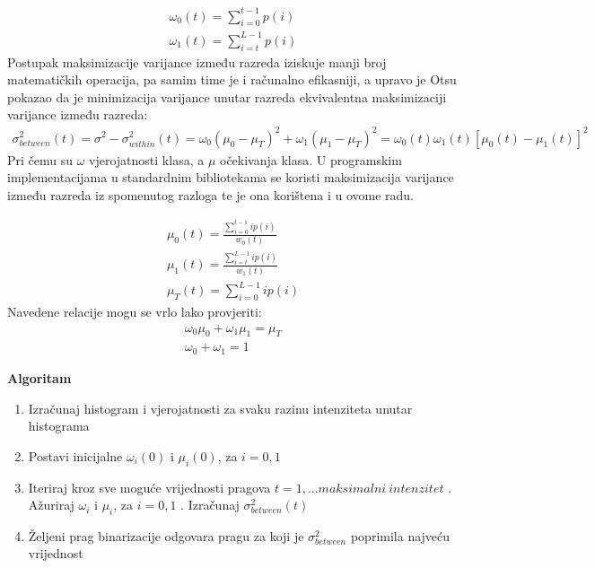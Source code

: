 \documentclass[times, utf8, diplomski]{fer}
\theoremstyle{definition}
\begin{document}
\begin{equation}
\begin{aligned}
\omega_0(t) = \sum_{i=0}^{t-1}p(i) \\
\omega_1(t) = \sum_{i=t}^{L-1}p(i)
\end{aligned}
\end{equation}
Postupak maksimizacije varijance između razreda iziskuje manji broj matematičkih operacija, pa samim time je i računalno efikasniji, a upravo je Otsu pokazao da je minimizacija varijance unutar razreda ekvivalentna maksimizaciji varijance između razreda:
\begin{equation}
\begin{aligned}
\sigma^2_{between}(t) = \sigma^2 - \sigma^2_{within}(t) = \omega_0(\mu_0 - \mu_T)^2 + \omega_1(\mu_1 - \mu_T)^2 = \omega_0(t)\omega_1(t)[\mu_0(t) - \mu_1(t)]^2
\end{aligned}
\end{equation}
Pri čemu su $\omega$ vjerojatnosti klasa, a $\mu$ očekivanja klasa.
U programskim implementacijama u standardnim bibliotekama se koristi maksimizacija varijance između razreda iz spomenutog razloga te je ona korištena i u ovome radu.


\begin{equation}
\begin{aligned}
\mu_0(t) = \frac{\sum_{i=0}^{t-1}ip(i)}{w_0(t)} \\
\mu_1(t) = \frac{\sum_{i=t}^{L-1}ip(i)}{w_1(t)} \\
\mu_T(t) = \sum_{i=0}^{L-1}ip(i)
\end{aligned}
\end{equation}
Navedene relacije mogu se vrlo lako provjeriti:
\begin{equation}
\begin{aligned}
\omega_0\mu_0 + \omega_1\mu_1 = \mu_T \\
\omega_0 + \omega_1 = 1
\end{aligned}
\end{equation}

\textbf{Algoritam}

\begin{enumerate}
\item Izračunaj histogram i vjerojatnosti za svaku razinu intenziteta unutar histograma
\item Postavi inicijalne $\omega_i(0)$ i $\mu_i(0)$, za $i=0, 1$
\item Iteriraj kroz sve moguće vrijednosti pragova $t=1,...maksimalni\ intenzitet$
. Ažuriraj $\omega_i$ i $\mu_i$, za $i=0, 1$
. Izračunaj $\sigma^2_{between}(t)$
\item Željeni prag binarizacije odgovara pragu za koji je $\sigma^2_{between}$ poprimila najveću vrijednost
\end{enumerate}
\end{document}
